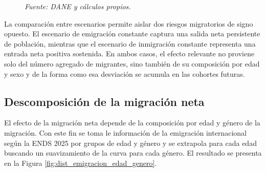 \documentclass[12pt,a4paper]{article}
\begin{document}
\begin{figure}[htbp]
\vspace{0.2cm}
\par\footnotesize{\textit{Fuente: DANE y cálculos propios.}}
\end{figure}

La comparación entre escenarios permite aislar dos riesgos migratorios de signo opuesto. El escenario de emigración constante captura una salida neta persistente de población, mientras que el escenario de inmigración constante representa una entrada neta positiva sostenida. En ambos casos, el efecto relevante no proviene solo del número agregado de migrantes, sino también de su composición por edad y sexo y de la forma como esa desviación se acumula en las cohortes futuras.

\subsection{Descomposición de la migración neta}

El efecto de la migración neta depende de la composición por edad y género de la migración. Con este fin se toma le información de la emigración internacional según la ENDS 2025 por grupos de edad y género y se extrapola para cada edad buscando un suavizamiento de la curva para cada género. El resultado se presenta en la Figura \ref{fig:dist_emigracion_edad_genero}. 
\end{document}
